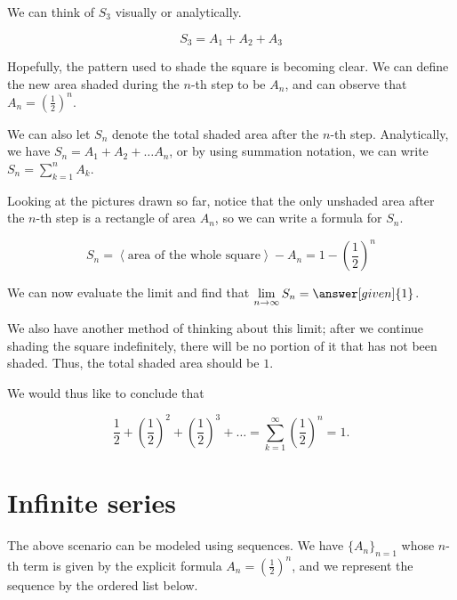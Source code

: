 \documentclass{ximera}
\begin{document}
\begin{example}
We can think of $S_3$ visually or analytically. 

\[
S_3 = A_1 + A_2 + A_3
\]



\vspace{3mm}



Hopefully, the pattern used to shade the square is becoming clear.  We can define the new area shaded during the $n$-th step to be $A_n$, and can observe that $A_n = \left( \frac{1}{2} \right)^n$.

We can also let $S_n$ denote the total shaded area after the $n$-th step.  Analytically, we have $S_n = A_1+A_2 + \ldots A_n$, or by using summation notation, we can write $\displaystyle S_n = \sum_{k=1}^n A_k$.

Looking at the pictures drawn so far, notice that the only unshaded area after the $n$-th step is a rectangle of area $A_n$, so we can write a formula for $S_n$.   

\[
S_n = \left<\textrm{area of the whole square}\right>-A_n = 1-\left(\frac{1}{2}\right)^n
\]

We can now evaluate the limit and find that $\lim\limits_{n \to \infty} S_n =\answer[given]{1}$.

We also have another method of thinking about this limit; after we continue shading the square indefinitely, there will be no portion of it that has not been shaded.  Thus, the total shaded area should be $1$.

We would thus like to conclude that

\[
\frac{1}{2} + \left(\frac{1}{2}\right)^2+ \left(\frac{1}{2}\right)^3+ \ldots = \sum\limits_{k=1}^{\infty} \left(\frac{1}{2}\right)^n =1.
\]
\end{example}

















\section{Infinite series}
The above scenario can be modeled using sequences.  We have $\{A_n\}_{n=1}$ whose $n$-th term is given by the explicit formula $A_n=\left(\frac{1}{2}\right)^n$, and we represent the sequence by the ordered list below.
\end{document}
